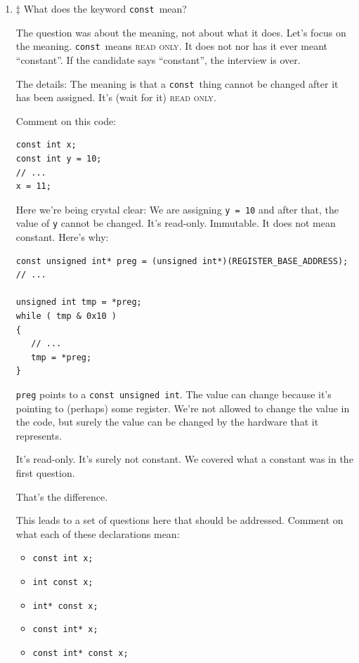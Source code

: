 \documentclass[12pt]{article}
\newcommand{\cconst}{{\texttt{const}}}%
\begin{document}
\begin{enumerate}
Any embedded software engineer applying should know this answer.

\item $\ddagger$ What does the keyword \cconst\  mean?

The question was about the meaning, not about what it does.  Let's focus on
the meaning.  \cconst\ means {\textsc{read only}}.  It does not
nor has it ever meant ``constant''.  If the candidate says ``constant'',
the interview is over.

The details:  The meaning is that a \cconst\ thing cannot be changed
after it has been assigned.  It's (wait for it) {\textsc{read only}}.

\par
Comment on this code:
\begin{lstlisting}
const int x;
const int y = 10;
// ...
x = 11;
\end{lstlisting}

\par
Here we're being crystal clear:  We are assigning {\texttt{y = 10}} and after that, the
value of {\texttt{y}} cannot be changed. It's read-only.  Immutable.
It does not mean constant. Here's why:

\begin{lstlisting}
const unsigned int* preg = (unsigned int*)(REGISTER_BASE_ADDRESS);
// ...

unsigned int tmp = *preg;
while ( tmp & 0x10 )
{
   // ...
   tmp = *preg;
}
\end{lstlisting}

{\texttt{preg}} points to a {\texttt{const unsigned int}}.  The value can change
because it's pointing to (perhaps) some register.  We're not allowed to change
the value in the code, but surely the value can be changed by the hardware
that it represents.

It's read-only.  It's surely not constant.  We covered what a constant
was in the first question.

That's the difference.

This leads to a set of questions here that should be addressed.
Comment on what each of these declarations mean:

\begin{itemize}
\item  {\texttt{const int x;}}
\item {\texttt{int const x;}}
\item {\texttt{int* const x;}}
\item {\texttt{const int* x;}}
\item {\texttt{const int* const x;}}
\end{itemize}


\end{enumerate}
\end{document}
